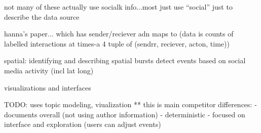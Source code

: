 not many of these actually use socialk info...most just use ``social'' just to describe the data source


hanna's paper...\cite{schein2015bayesian} which has sender/reciever adn maps to  (data is counts of labelled interactions at times-a 4 tuple of (sendrr, reciever, acton, time))


spatial: \cite{Neill:2005}
 \cite{mathioudakis2010identifying} identifying and describing spatial bursts
\cite{liu2011using} detect events based on social media activity (incl lat long)



\PP visualizations and interfaces

TODO: \cite{dou2012leadline} uses topic modeling, viualization ** this is main competitor  differences:
 - documents overall (not using author information)
 - deterministic
 - focused on interface and exploration (users can adjust events)












